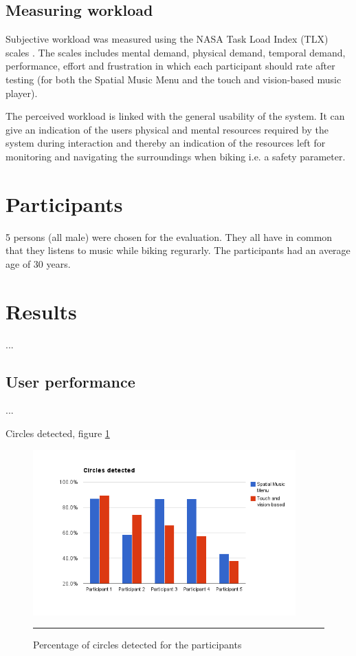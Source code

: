\subsection{Measuring workload}
Subjective workload was measured using the NASA Task Load Index (TLX) scales \cite{hart_workload_1990}. The scales includes mental demand, physical demand, temporal demand, performance, effort and frustration in which each participant should rate after testing (for both the Spatial Music Menu and the touch and vision-based music player). 

The perceived workload is linked with the general usability of the system. It can give an indication of the users physical and mental resources required by the system during interaction and thereby an indication of the resources left for monitoring and navigating the surroundings when biking i.e. a safety parameter.


\section{Participants}
5 persons (all male) were chosen for the evaluation. They all have in common that they listens to music while biking regurarly. The participants had an average age of 30 years.


\section{Results}
...

\subsection{User performance}
...

Circles detected, figure \ref{fig:resultscircles}

\begin{figure}[htbp]
	\centering
		\includegraphics[width=0.9\textwidth,height=\textheight,keepaspectratio]{./Figures/results_circles.png}
		\rule{35em}{1pt}
	\caption[Results circle detections]{Percentage of circles detected for the participants}
	\label{fig:resultscircles}
\end{figure}


